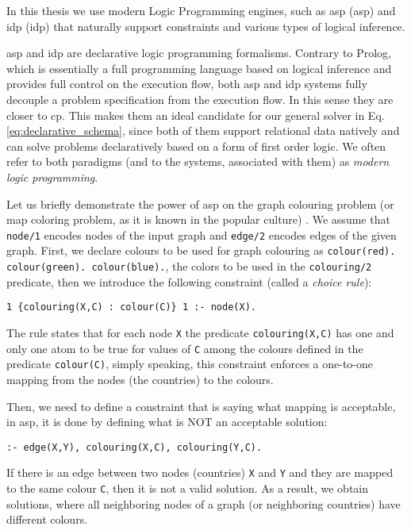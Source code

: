 In this thesis we use modern Logic Programming engines, such
as \acrlong{asp} (\acrshort{asp}) \parencite{ASPbook,whatisasp} and
\acrlong{idp} (\acrshort{idp})
\parencite{idp} %
that naturally support constraints and various types of logical
inference.

\pubrev
\acrshort{asp} and \acrshort{idp} are declarative logic programming
formalisms. Contrary to Prolog, which is essentially a full
programming language based on logical inference and provides full
control on the execution flow,  both \acrshort{asp} and \acrshort{idp}
systems fully decouple a problem specification from the execution
flow. In this sense they are closer to \acrlong{cp}. This makes them
an ideal candidate for our general solver in Eq. 
\ref{eq:declarative_schema}, since both of them support relational
data natively and can solve problems declaratively based on a form of
first order logic. We often refer to both paradigms (and to the systems,
associated with them) as \textit{modern logic programming}.

Let us briefly demonstrate the power of \acrshort{asp} on the graph colouring problem (or map coloring problem, as it is known in the popular culture) \parencite{ASPbook}. We assume that \texttt{node/1} encodes nodes of the input graph and \texttt{edge/2} encodes edges of the given graph. First, we declare colours to be used for graph colouring as \texttt{colour(red). colour(green). colour(blue).}, the colors to be used in the \texttt{colouring/2} predicate, then we introduce the following constraint (called a \textit{choice rule}):
\begin{verbatim}
1 {colouring(X,C) : colour(C)} 1 :- node(X).
\end{verbatim}
The rule states that for each node \texttt{X} the predicate \texttt{colouring(X,C)} has one and only one atom to be true for values of \texttt{C} among the colours defined in the predicate \texttt{colour(C)}, simply speaking, this constraint enforces a one-to-one mapping from the nodes (the countries) to the colours.

Then, we need to define a constraint that is saying what mapping is acceptable, in \acrshort{asp}, it is done by defining what is NOT an acceptable solution:
\begin{verbatim}
:- edge(X,Y), colouring(X,C), colouring(Y,C).
\end{verbatim}
If there is an edge between two nodes (countries) \texttt{X} and \texttt{Y} and they are mapped to the same colour \texttt{C}, then it is not a valid solution. As a result, we obtain solutions, where all neighboring nodes of a graph (or neighboring countries) have different colours.
\pubrevend

